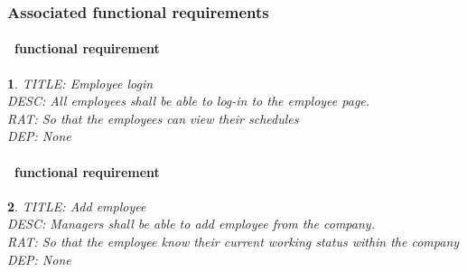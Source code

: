 \documentclass{scrreprt}
\theoremstyle{funreq}
\newtheorem{funreq}{}
\begin{document}
	\subsubsection{Associated functional requirements}
	\paragraph[]{\Subsectionname ~functional requirement }
	\begin{funreq}
		\label{employee_login}
		TITLE: Employee login\\
		DESC: All employees shall be able to log-in to the employee page.\\
		RAT: So that the employees can view their schedules\\
		DEP: None
	\end{funreq}
	
	\paragraph[]{\Subsectionname ~functional requirement }
	\begin{funreq}
		\label{employee_add}
		TITLE: Add employee\\
		DESC: Managers shall be able to add employee from the company.  \\
		RAT:  So that the employee know their current working status within the company\\
		DEP: None
	\end{funreq}
\end{document}
